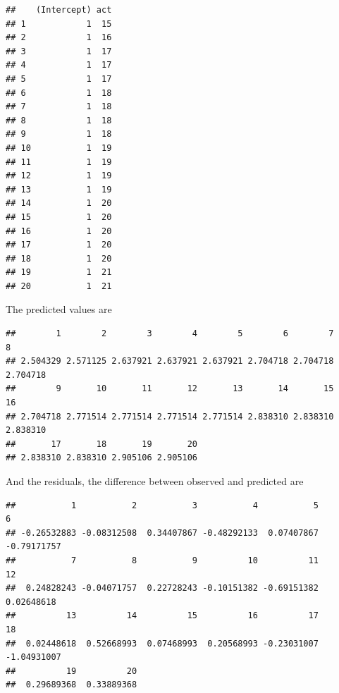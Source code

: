 \documentclass[]{book}
\newenvironment{Shaded}{\begin{snugshade}}{\end{snugshade}}
\newcommand{\KeywordTok}[1]{\textcolor[rgb]{0.13,0.29,0.53}{\textbf{#1}}}
\newcommand{\DataTypeTok}[1]{\textcolor[rgb]{0.13,0.29,0.53}{#1}}
\newcommand{\DecValTok}[1]{\textcolor[rgb]{0.00,0.00,0.81}{#1}}
\newcommand{\OperatorTok}[1]{\textcolor[rgb]{0.81,0.36,0.00}{\textbf{#1}}}
\newcommand{\NormalTok}[1]{#1}
\theoremstyle{definition}
\theoremstyle{definition}
\theoremstyle{definition}
\theoremstyle{remark}
\begin{document}
\begin{verbatim}
##    (Intercept) act
## 1            1  15
## 2            1  16
## 3            1  17
## 4            1  17
## 5            1  17
## 6            1  18
## 7            1  18
## 8            1  18
## 9            1  18
## 10           1  19
## 11           1  19
## 12           1  19
## 13           1  19
## 14           1  20
## 15           1  20
## 16           1  20
## 17           1  20
## 18           1  20
## 19           1  21
## 20           1  21
\end{verbatim}

The predicted values are

\begin{Shaded}
\end{Shaded}

\begin{verbatim}
##        1        2        3        4        5        6        7        8 
## 2.504329 2.571125 2.637921 2.637921 2.637921 2.704718 2.704718 2.704718 
##        9       10       11       12       13       14       15       16 
## 2.704718 2.771514 2.771514 2.771514 2.771514 2.838310 2.838310 2.838310 
##       17       18       19       20 
## 2.838310 2.838310 2.905106 2.905106
\end{verbatim}

And the residuals, the difference between observed and predicted are

\begin{Shaded}
\end{Shaded}

\begin{verbatim}
##           1           2           3           4           5           6 
## -0.26532883 -0.08312508  0.34407867 -0.48292133  0.07407867 -0.79171757 
##           7           8           9          10          11          12 
##  0.24828243 -0.04071757  0.22728243 -0.10151382 -0.69151382  0.02648618 
##          13          14          15          16          17          18 
##  0.02448618  0.52668993  0.07468993  0.20568993 -0.23031007 -1.04931007 
##          19          20 
##  0.29689368  0.33889368
\end{verbatim}
\end{document}
